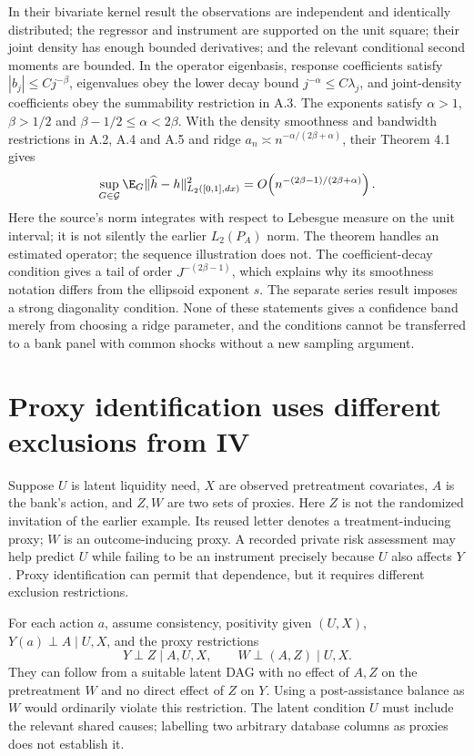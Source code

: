 In their bivariate kernel result the observations are independent and
identically distributed; the regressor and instrument are supported
on the unit square; their joint density has enough bounded derivatives;
and the relevant conditional second moments are bounded. In the
operator eigenbasis, response coefficients satisfy $|b_j|\le Cj^{-\beta}$,
eigenvalues obey the lower decay bound $j^{-\alpha}\le C\lambda_j$,
and joint-density coefficients obey the summability restriction in A.3.
The exponents satisfy $\alpha>1$, $\beta>1/2$ and
$\beta-1/2\le\alpha<2\beta$. With the density smoothness and
bandwidth restrictions in A.2, A.4 and A.5 and ridge
$a_n\asymp n^{-\alpha/(2\beta+\alpha)}$, their Theorem 4.1 gives
\begin{equation}
 \sup_{G\in\mathcal G}\E_G\|\widehat h-h\|_{L_2([0,1],dx)}^2
       =O\!\left(n^{-(2\beta-1)/(2\beta+\alpha)}\right).
 \label{r3:hall-rate}
\end{equation}
Here the source's norm integrates with respect to Lebesgue measure on
the unit interval; it is not silently the earlier $L_2(P_A)$ norm.
The theorem handles an estimated operator; the sequence illustration
does not. The coefficient-decay condition gives a tail of order
$J^{-(2\beta-1)}$, which explains why its smoothness notation differs
from the ellipsoid exponent $s$. The separate series result imposes
a strong diagonality condition. None of these statements gives a
confidence band merely from choosing a ridge parameter, and the
conditions cannot be transferred to a bank panel with common shocks
without a new sampling argument.

\section{Proxy identification uses different exclusions from IV}
\label{r3:proxy-identification}
Suppose $U$ is latent liquidity need, $X$ are observed pretreatment
covariates, $A$ is the bank's action, and $Z,W$ are two sets of proxies.
Here $Z$ is not the randomized invitation of the earlier example.
Its reused letter denotes a treatment-inducing proxy; $W$ is an
outcome-inducing proxy. A recorded private risk assessment may help
predict $U$ while failing to be an instrument precisely because $U$
also affects $Y$. Proxy identification can permit that dependence,
but it requires different exclusion restrictions.

For each action $a$, assume consistency, positivity given $(U,X)$,
$Y(a)\perp A\mid U,X$, and the proxy restrictions
\[
 Y\perp Z\mid A,U,X,\qquad W\perp(A,Z)\mid U,X.
\]
They can follow from a suitable latent DAG with no effect of $A,Z$
on the pretreatment $W$ and no direct effect of $Z$ on $Y$.
Using a post-assistance balance as $W$ would ordinarily violate this
restriction. The latent condition $U$ must include the relevant shared
causes; labelling two arbitrary database columns as proxies does not
establish it.

